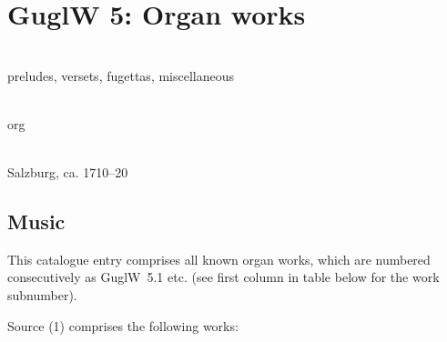 \documentclass[abbrwidth=7em,shorttitlesize=55]{ees}
\begin{document}
\clearpage
\section{GuglW 5: Organ works}

\\
preludes, versets, fugettas, miscellaneous

\\
org

\\
Salzburg, ca. 1710–20


\subsection{Music}

This catalogue entry comprises all known organ works, which are numbered consecutively as GuglW~5.1 etc. (see first column in table below for the work subnumber).

Source (1) comprises the following works:
\end{document}
